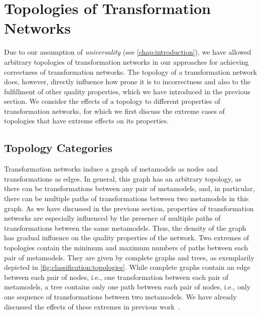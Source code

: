 \section{Topologies of Transformation Networks}
\label{chap:classification:topologies}

Due to our assumption of \emph{universality} (see \autoref{chap:introduction}), we have allowed arbitrary topologies of transformation networks in our approaches for achieving correctness of transformation networks.
The topology of a transformation network does, however, directly influence how prone it is to incorrectness and also to the fulfillment of other quality properties, which we have introduced in the previous section.
We consider the effects of a topology to different properties of transformation networks, for which we first discuss the extreme cases of topologies that have extreme effects on its properties.


\subsection{Topology Categories}

Transformation networks induce a graph of metamodels as nodes and transformations as edges.
In general, this graph has an arbitrary topology, as there can be transformations between any pair of metamodels, and, in particular, there can be multiple paths of transformations between two metamodels in this graph.
As we have discussed in the previous section, properties of transformation networks are especially influenced by the presence of multiple paths of transformations between the same metamodels.
Thus, the density of the graph has gradual influence on the quality properties of the network.
Two extremes of topologies contain the minimum and maximum numbers of paths between each pair of metamodels.
They are given by complete graphs and trees, as exemplarily depicted in \autoref{fig:classification:topologies}.
While complete graphs contain an edge between each pair of nodes, i.e., one transformation between each pair of metamodels, a tree contains only one path between each pair of nodes, i.e., only one sequence of transformations between two metamodels.
We have already discussed the effects of these extremes in previous work~.

